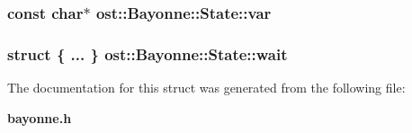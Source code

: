 \subsubsection[{var}]{\setlength{\rightskip}{0pt plus 5cm}const char$\ast$ {\bf ost::Bayonne::State::var}}\label{structost_1_1_bayonne_1_1_state_a4353c54b5b2523beb38eb05dd8483f4f}
\subsubsection[{wait}]{\setlength{\rightskip}{0pt plus 5cm}struct \{ ... \} 	 {\bf ost::Bayonne::State::wait}}\label{structost_1_1_bayonne_1_1_state_a1d05d712a5ad473665f4f3091fe43cbf}


The documentation for this struct was generated from the following file:\begin{DoxyCompactItemize}
\item 
{\bf bayonne.h}\end{DoxyCompactItemize}
